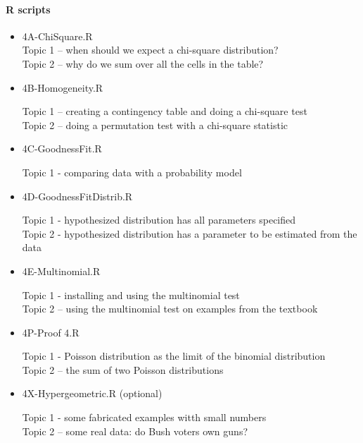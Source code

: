 \documentclass[12pt]{article}
\begin{document}
\pagebreak


\paragraph*{R scripts}
\begin{itemize}
\item 4A-ChiSquare.R\\
Topic 1 -- when should we expect a chi-square distribution?\\
Topic 2 -- why do we sum over all the cells in the table?\\

\item 4B-Homogeneity.R

Topic 1 -- creating a contingency table and doing a chi-square test\\
Topic 2 -- doing a permutation test with a chi-square statistic\\

\item 4C-GoodnessFit.R

Topic 1 - comparing data with a probability model

\item 4D-GoodnessFitDistrib.R

Topic 1 - hypothesized distribution has all parameters specified\\
Topic 2 - hypothesized distribution has a parameter to be estimated from the data

\item 4E-Multinomial.R

Topic 1 - installing and using the multinomial test\\
Topic 2 -- using the multinomial test on examples from the textbook

\item  4P-Proof 4.R

Topic 1 - Poisson distribution as the limit of the binomial distribution \\
Topic 2 -- the sum of two Poisson distributions

\item 4X-Hypergeometric.R (optional)

Topic 1 - some fabricated examples witth small numbers\\
Topic 2 -- some real data: do Bush voters own guns?

\end{itemize}

\pagebreak
\end{document}
